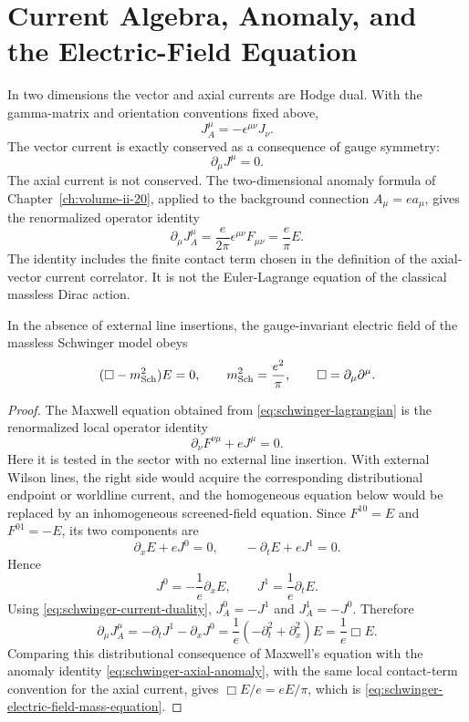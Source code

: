 \section{Current Algebra, Anomaly, and the Electric-Field Equation}

In two dimensions the vector and axial currents are Hodge dual.  With the
gamma-matrix and orientation conventions fixed above,
\begin{equation}
  J_A^\mu=-\epsilon^{\mu\nu}J_\nu .
  \label{eq:schwinger-current-duality}
\end{equation}
The vector current is exactly conserved as a consequence of gauge symmetry:
\[
  \partial_\mu J^\mu=0 .
\]
The axial current is not conserved.  The two-dimensional anomaly formula of
Chapter~\ref{ch:volume-ii-20}, applied to the background connection
\(A_\mu=e a_\mu\), gives the renormalized operator identity
\begin{equation}
  \partial_\mu J_A^\mu
  =
  \frac{e}{2\pi}\epsilon^{\mu\nu}F_{\mu\nu}
  =
  \frac{e}{\pi}E .
  \label{eq:schwinger-axial-anomaly}
\end{equation}
The identity includes the finite contact term chosen in the definition of
the axial-vector current correlator.  It is not the Euler-Lagrange equation
of the classical massless Dirac action.

\begin{proposition}
\label{prop:schwinger-anomaly-induced-electric-mass}
  In the absence of external line insertions, the gauge-invariant electric
  field of the massless Schwinger model obeys
  \begin{equation}
    (\Box-m_{\rm Sch}^2)E=0,
    \qquad
    m_{\rm Sch}^2=\frac{e^2}{\pi},
    \qquad
    \Box=\partial_\mu\partial^\mu .
    \label{eq:schwinger-electric-field-mass-equation}
  \end{equation}
\end{proposition}

\begin{proof}
  The Maxwell equation obtained from \eqref{eq:schwinger-lagrangian} is the
  renormalized local operator identity
  \[
    \partial_\nu F^{\nu\mu}+eJ^\mu=0 .
  \]
  Here it is tested in the sector with no external line insertion.  With
  external Wilson lines, the right side would acquire the corresponding
  distributional endpoint or worldline current, and the homogeneous equation
  below would be replaced by an inhomogeneous screened-field equation.
  Since \(F^{10}=E\) and \(F^{01}=-E\), its two components are
  \[
    \partial_xE+eJ^0=0,
    \qquad
    -\partial_tE+eJ^1=0 .
  \]
  Hence
  \[
    J^0=-\frac1e\partial_xE,
    \qquad
    J^1=\frac1e\partial_tE .
  \]
  Using \eqref{eq:schwinger-current-duality},
  \(J_A^0=-J^1\) and \(J_A^1=-J^0\).  Therefore
  \[
    \partial_\mu J_A^\mu
    =
    -\partial_tJ^1-\partial_xJ^0
    =
    \frac1e(-\partial_t^2+\partial_x^2)E
    =
    \frac1e\Box E .
  \]
  Comparing this distributional consequence of Maxwell's equation with the
  anomaly identity \eqref{eq:schwinger-axial-anomaly}, with the same local
  contact-term convention for the axial current, gives
  \(\Box E/e=eE/\pi\), which is \eqref{eq:schwinger-electric-field-mass-equation}.
\end{proof}

